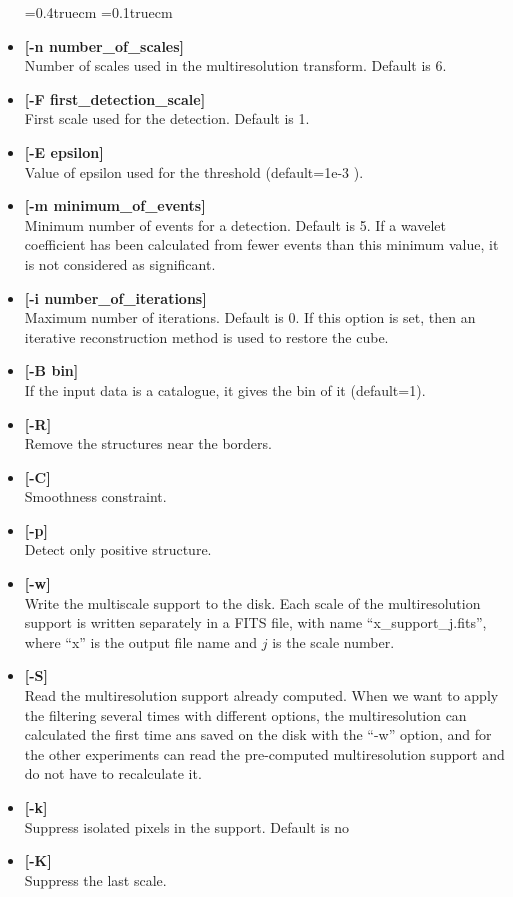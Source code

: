 \begin{itemize}
\baselineskip=0.4truecm
\itemsep=0.1truecm
\item {\bf [-n number\_of\_scales]}  \\
Number of scales used in the multiresolution transform.
Default is 6.
\item {\bf [-F first\_detection\_scale]} \\
First scale used for the detection. Default is 1.
\item {\bf [-E epsilon]}  \\
Value of epsilon used for the threshold (default=1e-3 ).
\item {\bf [-m minimum\_of\_events]}  \\
Minimum number of events for a detection. Default is 5. If a wavelet 
coefficient has been calculated from fewer events than this minimum
value, it is not considered as significant.
\item {\bf [-i number\_of\_iterations]}  \\
 Maximum number of iterations. Default is 0.
 If this option is set, then an iterative reconstruction method is used to
 restore the cube.
\item {\bf [-B bin]}  \\
 If the input data is a catalogue, it gives the bin of it (default=1).
\item {\bf [-R]}  \\
  Remove the structures near the borders.
\item {\bf [-C]}  \\
Smoothness constraint. 
\item {\bf [-p]}  \\
Detect only positive structure.
\item {\bf [-w]}  \\
Write the multiscale support to the disk. Each scale of the multiresolution
support is written separately in a FITS file, 
with name ``x\_support\_j.fits'', where ``x'' is the output file name
and $j$ is the scale number.
\item {\bf [-S]}  \\
Read the multiresolution support already computed. When we want to 
apply the filtering several times with different options, the
multiresolution can calculated the first time ans saved on the disk
with the ``-w'' option, and for the other experiments can read the
pre-computed multiresolution support and do not have to recalculate it.
\item {\bf [-k]}  \\
Suppress isolated pixels in the support. Default is no
\item {\bf [-K]} \\       
Suppress the last scale.
\end{itemize}

